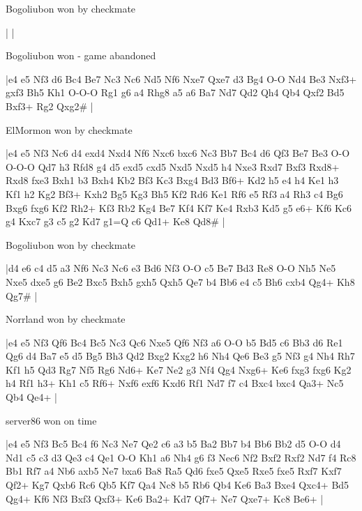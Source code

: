 \showboard

Bogoliubon won by checkmate

\makegametitle
| |

\showboard

Bogoliubon won - game abandoned

\makegametitle
|e4 e5 Nf3 d6 Bc4 Be7 Nc3 Nc6 Nd5 Nf6 Nxe7 Qxe7 d3 Bg4 O-O Nd4 Be3 Nxf3+ gxf3 Bh5 Kh1 O-O-O Rg1 g6 a4 Rhg8 a5 a6 Ba7 Nd7 Qd2 Qh4 Qb4 Qxf2 Bd5 Bxf3+ Rg2 Qxg2\#  |

\showboard

ElMormon won by checkmate

\makegametitle
|e4 e5 Nf3 Nc6 d4 exd4 Nxd4 Nf6 Nxc6 bxc6 Nc3 Bb7 Bc4 d6 Qf3 Be7 Be3 O-O O-O-O Qd7 h3 Rfd8 g4 d5 exd5 cxd5 Nxd5 Nxd5 h4 Nxe3 Rxd7 Bxf3 Rxd8+ Rxd8 fxe3 Bxh1 b3 Bxh4 Kb2 Bf3 Kc3 Bxg4 Bd3 Bf6+ Kd2 h5 e4 h4 Ke1 h3 Kf1 h2 Kg2 Bf3+ Kxh2 Bg5 Kg3 Bh5 Kf2 Rd6 Ke1 Rf6 e5 Rf3 a4 Rh3 c4 Bg6 Bxg6 fxg6 Kf2 Rh2+ Kf3 Rb2 Kg4 Be7 Kf4 Kf7 Ke4 Rxb3 Kd5 g5 e6+ Kf6 Kc6 g4 Kxc7 g3 c5 g2 Kd7 g1=Q c6 Qd1+ Ke8 Qd8\#  |

\showboard

Bogoliubon won by checkmate

\makegametitle
|d4 e6 c4 d5 a3 Nf6 Nc3 Nc6 e3 Bd6 Nf3 O-O c5 Be7 Bd3 Re8 O-O Nh5 Ne5 Nxe5 dxe5 g6 Be2 Bxc5 Bxh5 gxh5 Qxh5 Qe7 b4 Bb6 e4 c5 Bh6 cxb4 Qg4+ Kh8 Qg7\#  |

\showboard

Norrland won by checkmate

\makegametitle
|e4 e5 Nf3 Qf6 Bc4 Bc5 Nc3 Qc6 Nxe5 Qf6 Nf3 a6 O-O b5 Bd5 c6 Bb3 d6 Re1 Qg6 d4 Ba7 e5 d5 Bg5 Bh3 Qd2 Bxg2 Kxg2 h6 Nh4 Qe6 Be3 g5 Nf3 g4 Nh4 Rh7 Kf1 h5 Qd3 Rg7 Nf5 Rg6 Nd6+ Ke7 Ne2 g3 Nf4 Qg4 Nxg6+ Ke6 fxg3 fxg6 Kg2 h4 Rf1 h3+ Kh1 c5 Rf6+ Nxf6 exf6 Kxd6 Rf1 Nd7 f7 c4 Bxc4 bxc4 Qa3+ Nc5 Qb4 Qe4+  |

\showboard

server86 won on time

\makegametitle
|e4 e5 Nf3 Bc5 Bc4 f6 Nc3 Ne7 Qe2 c6 a3 b5 Ba2 Bb7 b4 Bb6 Bb2 d5 O-O d4 Nd1 c5 c3 d3 Qe3 c4 Qe1 O-O Kh1 a6 Nh4 g6 f3 Nec6 Nf2 Bxf2 Rxf2 Nd7 f4 Rc8 Bb1 Rf7 a4 Nb6 axb5 Ne7 bxa6 Ba8 Ra5 Qd6 fxe5 Qxe5 Rxe5 fxe5 Rxf7 Kxf7 Qf2+ Kg7 Qxb6 Rc6 Qb5 Kf7 Qa4 Nc8 b5 Rb6 Qb4 Ke6 Ba3 Bxe4 Qxc4+ Bd5 Qg4+ Kf6 Nf3 Bxf3 Qxf3+ Ke6 Ba2+ Kd7 Qf7+ Ne7 Qxe7+ Kc8 Be6+  |

